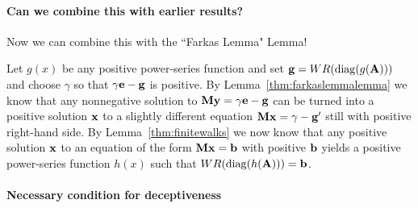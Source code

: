 \paragraph{Can we combine this with earlier results?}
Now we can combine this with the ``Farkas Lemma" Lemma!

Let $g(x)$ be any positive power-series function and set $\textbf{g} = WR(\operatorname{diag}(g(\textbf{A})))$ and choose $\gamma$ so that $\gamma\textbf{e} - \textbf{g}$ is positive. By Lemma~\ref{thm:farkaslemmalemma} we know that any nonnegative solution to $\textbf{M} \textbf{y} = \gamma \textbf{e} -\textbf{g}$ can be turned into a positive solution $\textbf{x}$ to a slightly different equation $\textbf{M}\textbf{x} = \gamma - \textbf{g}'$ still with positive right-hand side.
By Lemma~\ref{thm:finitewalks} we now know that any positive solution $\textbf{x}$ to an equation of the form $\textbf{M}\textbf{x} = \textbf{b}$ with positive $\textbf{b}$ yields a positive power-series function $h(x)$ such that $WR( \operatorname{diag} (h(\textbf{A})) ) = \textbf{b}$.


%




\paragraph{Necessary condition for deceptiveness}

